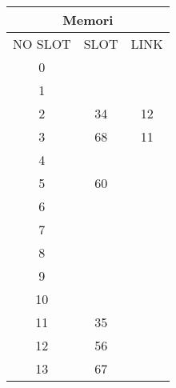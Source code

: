 \documentclass[12pt,a4paper]{article}
\begin{document}
\begin{enumerate}
\begin{multicols}{2}
      \begin{center}
        \begin{adjustbox}{scale=1,center}
          \begin{tabular}{ |c|c|c| } 
            \hline \multicolumn{3}{|c|}{Memori} \\ \hline \hline 
            NO SLOT & SLOT & LINK \\ \hline \hline
            0       &      &      \\ \hline
            1       &      &      \\ \hline
            2       & 34   &  12  \\ \hline
            3       & 68   &  11  \\ \hline
            4       &      &      \\ \hline
            5       & 60   &      \\ \hline
            6       &      &      \\ \hline
            7       &      &      \\ \hline
            8       &      &      \\ \hline
            9       &      &      \\ \hline
            10      &      &      \\ \hline
            11      & 35   &      \\ \hline
            12      & 56   &      \\ \hline
            13      & 67   &      \\ \hline
          \end{tabular}
        \end{adjustbox}
      \end{center}


\end{multicols}
\end{enumerate}
\end{document}
